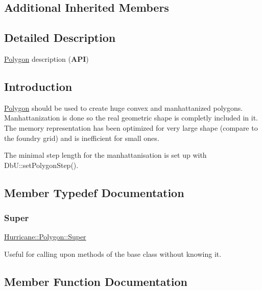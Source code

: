 \subsection*{Additional Inherited Members}


\subsection{Detailed Description}
\mbox{\hyperlink{classHurricane_1_1Polygon}{Polygon}} description ({\bfseries A\+PI}) 

\hypertarget{classHurricane_1_1Polygon_secPolygonIntro}{}\subsection{Introduction}\label{classHurricane_1_1Polygon_secPolygonIntro}
\mbox{\hyperlink{classHurricane_1_1Polygon}{Polygon}} should be used to create huge convex and manhattanized polygons. Manhattanization is done so the real geometric shape is completly included in it. The memory representation has been optimized for very large shape (compare to the foundry grid) and is inefficient for small ones.

The minimal step length for the manhattanisation is set up with Db\+U\+::set\+Polygon\+Step(). 

\subsection{Member Typedef Documentation}
\mbox{\label{classHurricane_1_1Polygon_adac4dcd1480b81e7778775540b95f81c}} 
\subsubsection{\texorpdfstring{Super}{Super}}
{\footnotesize\ttfamily \mbox{\hyperlink{classHurricane_1_1Polygon_adac4dcd1480b81e7778775540b95f81c}{Hurricane\+::\+Polygon\+::\+Super}}}

Useful for calling upon methods of the base class without knowing it. 

\subsection{Member Function Documentation}
\mbox{\label{classHurricane_1_1Polygon_ac248679558ff51bf509b28050027b7da}} 
